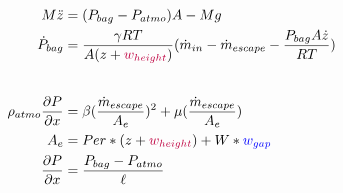 \documentclass[11pt,a4paper]{scrartcl}\usepackage{amssymb,bm}\usepackage{amsmath}
\begin{document}
\begin{align}
M \ddot{z} &= (P_{bag} - P_{atmo})A - Mg \\
\dot{P}_{bag} &= \frac{\gamma R T}{A (z+\textcolor{purple}{w_{height}})} (\dot{m}_{in} - \dot{m}_{escape} - \frac{P_{bag} A \dot{z}}{R T})\\[20pt]
\rho_{atmo} \frac{\partial P}{\partial x} &= \beta(\frac{\dot{m}_{escape}}{A_e})^2 + \mu(\frac{\dot{m}_{escape}}{A_e}) \\
A_{e} &= Per * (z+\textcolor{purple}{w_{height}}) + W*\textcolor{blue}{w_{gap}} \\
\frac{\partial P}{\partial x} &= \frac{P_{bag} - P_{atmo}}{\ell}
\end{align}
\end{document}
